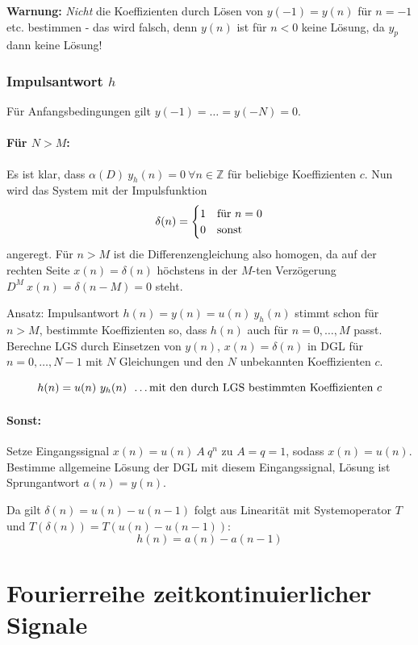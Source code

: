 \documentclass[10pt,a4paper]{article}
\newcommand{\fancythumb}[2]{
	\addthumb{#1}{\large\sffamily\textbf{\space\space#1\vspace{5pt}}}{white}{#2}
}
\begin{document}
\vspace{.5em}
\raggedright
\textbf{Warnung:} \textit{Nicht} die Koeffizienten durch Lösen von $y(-1) = y(n)$ für $n = -1$ etc. bestimmen - das wird falsch, denn $y(n)$ ist für $n < 0$ keine Lösung, da $y_p$ dann keine Lösung!

\subsubsection*{Impulsantwort $h$}
Für Anfangsbedingungen gilt $y(-1) = … = y(-N) = 0$.
\paragraph{Für $N > M$:} Es ist klar, dass $\alpha(D) ~ y_h(n) = 0 ~ \forall n \in \mathbb Z$ für beliebige Koeffizienten $c$. Nun wird das System mit der Impulsfunktion 
\[
	\delta(n) =
	\begin{cases}
		1 & \textnormal{für } n = 0 \\
		0 & \textnormal{sonst}
	\end{cases}
\]
angeregt. Für $n > M$ ist die Differenzengleichung also homogen, da auf der rechten Seite $x(n) = \delta(n)$ höchstens in der $M$-ten Verzögerung $D^M ~ x(n) = \delta(n - M) = 0$ steht.

\vspace{.5em}
Ansatz: Impulsantwort $h(n) = y(n) = u(n) ~ y_h(n)$ stimmt schon für $n > M$, bestimmte Koeffizienten so, dass $h(n)$ auch für $n = 0, …, M$ passt. Berechne LGS durch Einsetzen von $y(n)$, $x(n) = \delta(n)$ in DGL für $n = 0, …, N - 1$ mit $N$ Gleichungen und den $N$ unbekannten Koeffizienten $c$.

\[
	h(n) = u(n) ~ y_h(n) ~~ \textnormal{…mit den durch LGS bestimmten Koeffizienten $c$}
\]

\paragraph{Sonst:} Setze Eingangssignal $x(n) = u(n) ~ A ~ q^n$ zu $A = q = 1$, sodass $x(n) = u(n)$. Bestimme allgemeine Lösung der DGL mit diesem Eingangssignal, Lösung ist Sprungantwort $a(n) = y(n)$.

\vspace{.5em}
Da gilt $\delta(n) = u(n) - u(n - 1)$ folgt aus Linearität mit Systemoperator $T$ und $T(\delta(n)) = T(u(n) - u(n - 1))$:
\[
	h(n) = a(n) - a(n-1)
\]

\newpage
\section*{Fourierreihe zeitkontinuierlicher Signale}
\fancythumb{FR}{blue}
\end{document}
